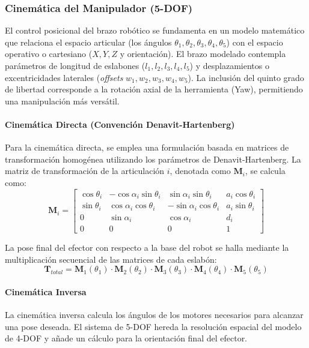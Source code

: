 \documentclass[12pt, a4paper]{article}
\begin{document}
\subsubsection{Cinemática del Manipulador (5-DOF)}
El control posicional del brazo robótico se fundamenta en un modelo matemático que relaciona el espacio articular (los ángulos $\theta_1, \theta_2, \theta_3, \theta_4, \theta_5$) con el espacio operativo o cartesiano ($X, Y, Z$ y orientación). El brazo modelado contempla parámetros de longitud de eslabones ($l_1, l_2, l_3, l_4, l_5$) y desplazamientos o excentricidades laterales (\textit{offsets} $w_1, w_2, w_3, w_4, w_5$). La inclusión del quinto grado de libertad corresponde a la rotación axial de la herramienta (Yaw), permitiendo una manipulación más versátil.

\paragraph{Cinemática Directa (Convención Denavit-Hartenberg)}
Para la cinemática directa, se emplea una formulación basada en matrices de transformación homogénea utilizando los parámetros de Denavit-Hartenberg. La matriz de transformación de la articulación $i$, denotada como $\mathbf{M}_i$, se calcula como:
\begin{equation}
    \mathbf{M}_i = 
    \begin{bmatrix}
        \cos\theta_i & -\cos\alpha_i\sin\theta_i & \sin\alpha_i\sin\theta_i & a_i\cos\theta_i \\
        \sin\theta_i & \cos\alpha_i\cos\theta_i & -\sin\alpha_i\cos\theta_i & a_i\sin\theta_i \\
        0 & \sin\alpha_i & \cos\alpha_i & d_i \\
        0 & 0 & 0 & 1
    \end{bmatrix}
\end{equation}

La pose final del efector con respecto a la base del robot se halla mediante la multiplicación secuencial de las matrices de cada eslabón:
\begin{equation}
    \mathbf{T}_{total} = \mathbf{M}_1(\theta_1) \cdot \mathbf{M}_2(\theta_2) \cdot \mathbf{M}_3(\theta_3) \cdot \mathbf{M}_4(\theta_4) \cdot \mathbf{M}_5(\theta_5)
\end{equation}

\paragraph{Cinemática Inversa}
La cinemática inversa calcula los ángulos de los motores necesarios para alcanzar una pose deseada. El sistema de 5-DOF hereda la resolución espacial del modelo de 4-DOF y añade un cálculo para la orientación final del efector.
\end{document}
